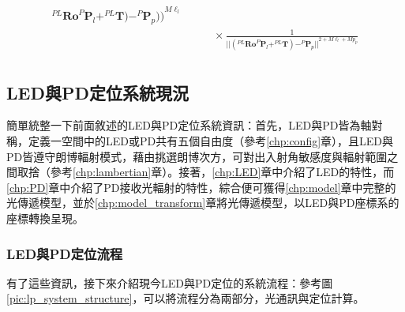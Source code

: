 \begin{description}
\begin{equation}
\begin{aligned}
{                                        ^{PL}\boldsymbol{Ro}^{P}\boldsymbol{P}_l
                                        +^{PL}\boldsymbol{T}
                                    )
                                    - ^{P}\boldsymbol{P}_p
                                )
                            )
                        }^{M\ell_{l}}   \\
                & \qquad \times
                   \frac{     
                        1   
                    } 
                    {
                        {
                            ||
                                (^{PL}\boldsymbol{Ro}^{P}\boldsymbol{P}_l+^{PL}\boldsymbol{T})
                                - ^{P}\boldsymbol{P}_p
                            ||
                        }^{2+M\ell_l+Mp_p}
                    }\\
            \end{aligned}
        \end{equation}

        \end{description}   


        






    \subsection{LED與PD定位系統現況}
    \label{chp:LEDPD_now}
        
        簡單統整一下前面敘述的LED與PD定位系統資訊：首先，LED與PD皆為軸對稱，定義一空間中的LED或PD共有五個自由度（參考\ref{chp:config}章），且LED與PD皆遵守朗博輻射模式，藉由挑選朗博次方，可對出入射角敏感度與輻射範圍之間取捨（參考\ref{chp:lambertian}章）。接著，\ref{chp:LED}章中介紹了LED的特性，而\ref{chp:PD}章中介紹了PD接收光輻射的特性，綜合便可獲得\ref{chp:model}章中完整的光傳遞模型，並於\ref{chp:model_transform}章將光傳遞模型，以LED與PD座標系的座標轉換呈現。



        

        \subsubsection{LED與PD定位流程}

        有了這些資訊，接下來介紹現今LED與PD定位的系統流程：參考圖\ref{pic:lp_system_structure}，可以將流程分為兩部分，光通訊與定位計算。

